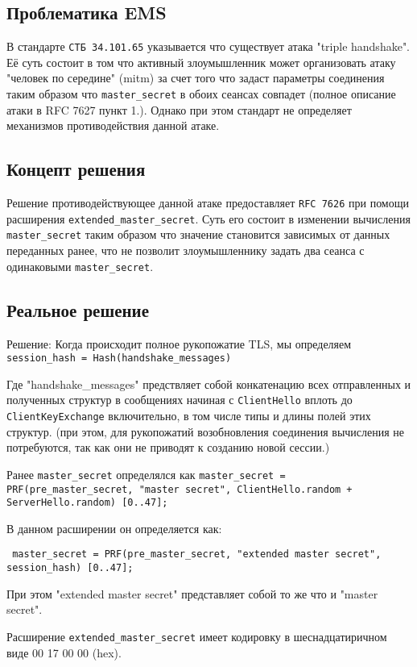 \subsection{Проблематика EMS}
В стандарте \texttt{СТБ 34.101.65} указывается что существует атака "triple handshake". Её суть состоит в том что активный злоумышленник может организовать атаку "человек по середине" (mitm) за счет того что задаст параметры соединения таким образом что \texttt{master\_secret} в обоих сеансах совпадет (полное описание атаки в RFC 7627 пункт 1.). Однако при этом стандарт не определяет механизмов противодействия данной атаке. 

\subsection{Концепт решения }
Решение противодействующее данной атаке предоставляет \texttt{RFC 7626} при помощи расширения \texttt{extended\_master\_secret}. Суть его состоит в изменении вычисления \texttt{master\_secret} таким образом что значение становится зависимых от данных переданных ранее, что не позволит злоумышленнику задать два сеанса с одинаковыми \texttt{master\_secret}.

\subsection{Реальное решение}
Решение: 
Когда происходит полное рукопожатие TLS, мы определяем 
\texttt{session\_hash = Hash(handshake\_messages)}

Где "handshake\_messages" предствляет собой конкатенацию всех отправленных и полученных структур в сообщениях начиная с \texttt{ClientHello} вплоть до \texttt{ClientKeyExchange} включительно, в том числе типы и длины полей этих структур. 
(при этом, для рукопожатий возобновления соединения вычисления не потребуются, так как они не приводят к созданию новой сессии.)

Ранее \texttt{master\_secret} определялся как 
\texttt{master\_secret = PRF(pre\_master\_secret, "master secret",
	ClientHello.random + ServerHello.random)
	[0..47];}

В данном расширении он определяется как:

\texttt{ master\_secret = PRF(pre\_master\_secret, "extended master secret", session\_hash) [0..47];}

При этом "extended master secret" представляет собой то же что и "master secret".

Расширение \texttt{extended\_master\_secret} имеет кодировку в шеснадцатиричном виде 00 17 00 00 (hex).

